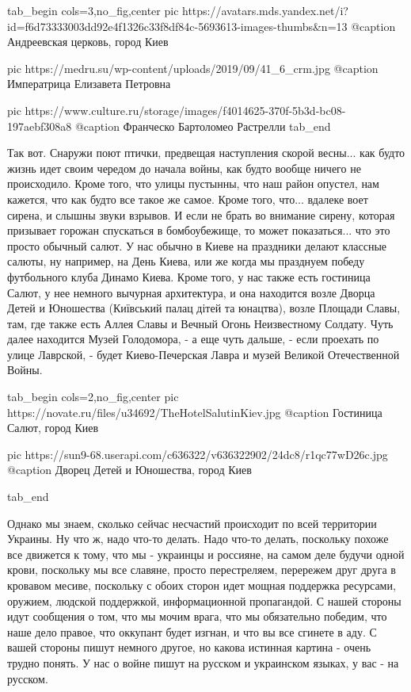 \ifcmt
  tab_begin cols=3,no_fig,center
     pic https://avatars.mds.yandex.net/i?id=f6d73333003dd92e4f1326c33f8df84c-5693613-images-thumbs&n=13
		 @caption Андреевская церковь, город Киев

		 pic https://medru.su/wp-content/uploads/2019/09/41_6_crm.jpg
		 @caption Императрица Елизавета Петровна

		 pic https://www.culture.ru/storage/images/f4014625-370f-5b3d-bc08-197aebf308a8
		 @caption Франческо Бартоломео Растрелли
  tab_end
\fi

Так вот. Снаружи поют птички, предвещая наступления скорой весны... как будто
жизнь идет своим чередом до начала войны, как будто вообще ничего не
происходило. Кроме того, что улицы пустынны, что наш район опустел, нам
кажется, что как будто все такое же самое. Кроме того, что... вдалеке воет
сирена, и слышны звуки взрывов.  И если не брать во внимание сирену, которая
призывает горожан спускаться в бомбоубежище, то может показаться... что это
просто обычный салют. У нас обычно в Киеве на праздники делают классные салюты,
ну например, на День Киева, или же когда мы празднуем победу футбольного клуба
Динамо Киева. Кроме того, у нас также есть гостиница Салют, у нее немного
вычурная архитектура, и она находится возле Дворца Детей и Юношества (Київський
палац дітей та юнацтва), возле Площади Славы, там, где также есть Аллея Славы и
Вечный Огонь Неизвестному Солдату. Чуть далее находится Музей Голодомора, - а
еще чуть дальше, - если проехать по улице Лаврской, - будет Киево-Печерская
Лавра и музей Великой Отечественной Войны.

\ifcmt
  tab_begin cols=2,no_fig,center
		 pic https://novate.ru/files/u34692/TheHotelSalutinKiev.jpg
		 @caption Гостиница Салют, город Киев

		 pic https://sun9-68.userapi.com/c636322/v636322902/24dc8/r1qc77wD26c.jpg
		 @caption Дворец Детей и Юношества, город Киев

  tab_end
\fi

Однако мы знаем, сколько сейчас несчастий происходит по всей территории
Украины. Ну что ж, надо что-то делать. Надо что-то делать, поскольку похоже все
движется к тому, что мы - украинцы и россияне, на самом деле будучи одной
крови, поскольку мы все славяне, просто перестреляем, перережем друг друга в
кровавом месиве, поскольку с обоих сторон идет мощная поддержка ресурсами,
оружием, людской поддержкой, информационной пропагандой. С нашей стороны идут
сообщения о том, что мы мочим врага, что мы обязательно победим, что наше дело
правое, что оккупант будет изгнан, и что вы все сгинете в аду. С вашей стороны
пишут немного другое, но какова истинная картина - очень трудно понять.  У нас
о войне пишут на русском и украинском языках, у вас - на русском.

